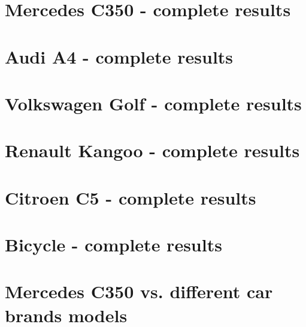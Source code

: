 \section{Mercedes C350 - complete results}
  
\section{Audi A4 - complete results}
  
\section{Volkswagen Golf - complete results}
  
\section{Renault Kangoo - complete results}
  
\section{Citroen C5 - complete results}
  
\section{Bicycle - complete results}
  
\section{Mercedes C350 vs. different car brands models}
  